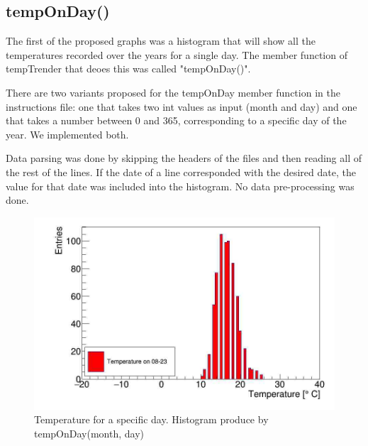 
\subsection{tempOnDay()}
The first of the proposed graphs was a histogram that will show all the temperatures recorded over the years for a single day. The member function of tempTrender that deoes this was called "tempOnDay()".\par
There are two variants proposed for the tempOnDay member function in the instructions file: one that takes two int values as input (month and day) and one that takes a number between 0 and 365, corresponding to a specific day of the year. We implemented both.\par
Data parsing was done by skipping the headers of the files and then reading all of the rest of the lines. If the date of a line corresponded with the desired date, the value for that date was included into the histogram. No data pre-processing was done. 

\begin{figure}[h]
\centering
\includegraphics[scale=0.3]{graph1.png}
\caption{Temperature for a specific day. Histogram produce by tempOnDay(month, day) }
\end{figure}